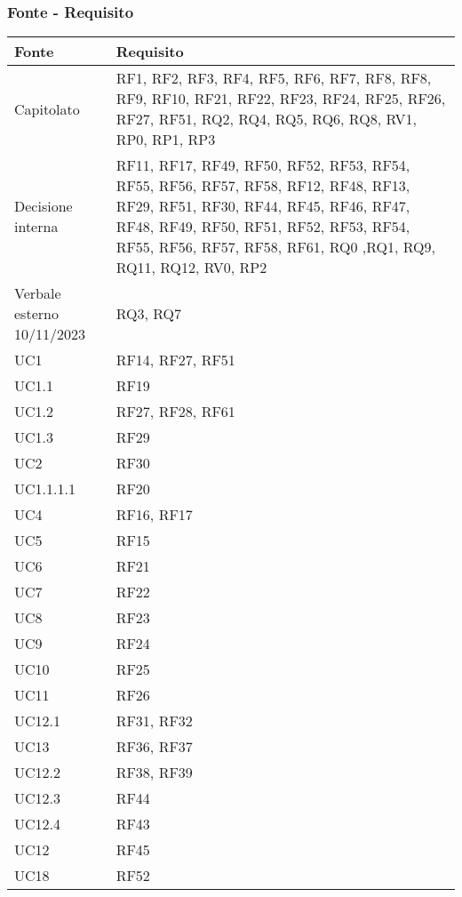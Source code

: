   \subsubsection{Fonte - Requisito}

\begin{center}
  \begin{longtable}{|C{5cm}|C{5cm}|}
    \hline
    \textbf{Fonte} & \textbf{Requisito} \\
    \hline
    Capitolato & RF1, RF2, RF3, RF4, RF5, RF6, RF7, RF8, RF8, RF9, RF10, RF21, RF22, RF23, RF24, RF25, RF26, RF27, RF51, RQ2, RQ4, RQ5, RQ6, RQ8, RV1, RP0, RP1, RP3  \\
    \hline
    Decisione interna & RF11, RF17, RF49, RF50, RF52, RF53, RF54, RF55, RF56, RF57, RF58, RF12, RF48, RF13, RF29, RF51, RF30, RF44, RF45, RF46, RF47, RF48, RF49, RF50, RF51, RF52, RF53, RF54, RF55, RF56, RF57, RF58, RF61, RQ0 ,RQ1, RQ9, RQ11, RQ12, RV0, RP2 \\
    \hline
    Verbale esterno 10/11/2023 & RQ3, RQ7 \\
    \hline
    UC1 & RF14, RF27, RF51 \\
    \hline
    UC1.1 & RF19  \\
    \hline
    UC1.2 & RF27, RF28, RF61 \\
    \hline
    UC1.3 &  RF29 \\
    \hline
    UC2 & RF30 \\
    \hline
    UC1.1.1.1 & RF20 \\
    \hline
    UC4 & RF16, RF17 \\
    \hline
    UC5 & RF15 \\
    \hline
    UC6 & RF21 \\
    \hline
    UC7 & RF22 \\
    \hline
    UC8 & RF23 \\
    \hline
    UC9 & RF24 \\
    \hline
    UC10 & RF25 \\
    \hline
    UC11 & RF26 \\
    \hline
    UC12.1 & RF31, RF32 \\
    \hline
    UC13 & RF36, RF37 \\
    \hline
    UC12.2 &  RF38, RF39 \\
    \hline
    UC12.3 & RF44 \\
    \hline
    UC12.4 & RF43 \\
    \hline
    UC12 & RF45 \\
    \hline
    UC18 & RF52 \\

\end{longtable}
\end{center}
